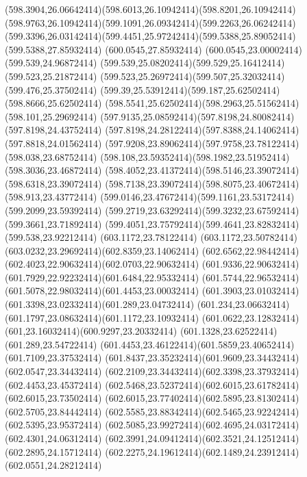 {{	\curveto(598.3904,26.06642414)(598.6013,26.10942414)(598.8201,26.10942414)
	\curveto(598.9763,26.10942414)(599.1091,26.09342414)(599.2263,26.06242414)
	\curveto(599.3396,26.03142414)(599.4451,25.97242414)(599.5388,25.89052414)
	\lineto(599.5388,27.85932414)
	\lineto(600.0545,27.85932414)
	\lineto(600.0545,23.00002414)
	\closepath
	\moveto(599.539,24.96872414)
	\curveto(599.539,25.08202414)(599.529,25.16412414)(599.523,25.21872414)
	\curveto(599.523,25.26972414)(599.507,25.32032414)(599.476,25.37502414)
	\curveto(599.39,25.53912414)(599.187,25.62502414)(598.8666,25.62502414)
	\curveto(598.5541,25.62502414)(598.2963,25.51562414)(598.101,25.29692414)
	\curveto(597.9135,25.08592414)(597.8198,24.80082414)(597.8198,24.43752414)
	\curveto(597.8198,24.28122414)(597.8388,24.14062414)(597.8818,24.01562414)
	\curveto(597.9208,23.89062414)(597.9758,23.78122414)(598.038,23.68752414)
	\curveto(598.108,23.59352414)(598.1982,23.51952414)(598.3036,23.46872414)
	\curveto(598.4052,23.41372414)(598.5146,23.39072414)(598.6318,23.39072414)
	\curveto(598.7138,23.39072414)(598.8075,23.40672414)(598.913,23.43772414)
	\curveto(599.0146,23.47672414)(599.1161,23.53172414)(599.2099,23.59392414)
	\curveto(599.2719,23.63292414)(599.3232,23.67592414)(599.3661,23.71892414)
	\curveto(599.4051,23.75792414)(599.4641,23.82832414)(599.538,23.92212414)
	\closepath
	\moveto(603.1172,23.78122414)
	\curveto(603.1172,23.50782414)(603.0232,23.29692414)(602.8359,23.14062414)
	\curveto(602.6562,22.98442414)(602.4023,22.90632414)(602.0703,22.90632414)
	\curveto(601.9336,22.90632414)(601.7929,22.92232414)(601.6484,22.95332414)
	\curveto(601.5744,22.96532414)(601.5078,22.98032414)(601.4453,23.00032414)
	\curveto(601.3903,23.01032414)(601.3398,23.02332414)(601.289,23.04732414)
	\curveto(601.234,23.06632414)(601.1797,23.08632414)(601.1172,23.10932414)
	\curveto(601.0622,23.12832414)(601,23.16032414)(600.9297,23.20332414)
	\lineto(601.1328,23.62522414)
	\lineto(601.289,23.54722414)
	\curveto(601.4453,23.46122414)(601.5859,23.40652414)(601.7109,23.37532414)
	\curveto(601.8437,23.35232414)(601.9609,23.34432414)(602.0547,23.34432414)
	\curveto(602.2109,23.34432414)(602.3398,23.37932414)(602.4453,23.45372414)
	\curveto(602.5468,23.52372414)(602.6015,23.61782414)(602.6015,23.73502414)
	\curveto(602.6015,23.77402414)(602.5895,23.81302414)(602.5705,23.84442414)
	\curveto(602.5585,23.88342414)(602.5465,23.92242414)(602.5395,23.95372414)
	\curveto(602.5085,23.99272414)(602.4695,24.03172414)(602.4301,24.06312414)
	\curveto(602.3991,24.09412414)(602.3521,24.12512414)(602.2895,24.15712414)
	\curveto(602.2275,24.19612414)(602.1489,24.23912414)(602.0551,24.28212414)
}}
